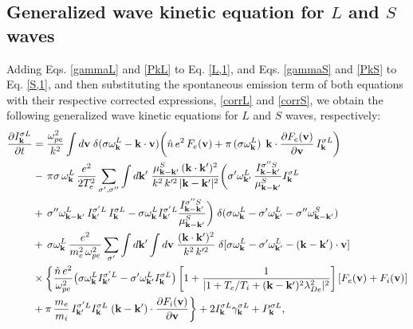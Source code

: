 \documentclass[12pt,a4paper,ruledheader]{report}
\begin{document}
\subsection{Generalized wave kinetic equation for $L$ and $S$ waves}
Adding Eqs. \eqref{gammaL} and \eqref{PkL} to Eq. \eqref{L,1},
and Eqs. \eqref{gammaS} and \eqref{PkS} to Eq. \eqref{S,1}, and
then substituting the spontaneous emission term of both equations
with their respective corrected expressions, \eqref{corrL} and
\eqref{corrS}, we obtain the following generalized wave kinetic
equations for $L$ and $S$ waves, respectively:
\begin{equation}
  \label{L-gen}
  \begin{split}
\frac{\partial I_{\bf k}^{\sigma L}}{\partial t}
&=\frac{\omega_{pe}^2}{k^2}\int d{\bf v}\;
\delta(\sigma\omega_{\bf k}^L-{\bf k}\cdot{\bf v})
\biggl(\hat{n}\,e^2\,F_e({\bf v})+\pi\,(\sigma\omega_{\bf k}^L)\,
\;{\bf k}\cdot\frac{\partial F_e({\bf v})}{\partial{\bf v}}
\,I_{\bf k}^{\sigma L}\biggr)\\
&-\,\pi\sigma\,\omega_{\bf k}^L
\,\frac{e^2}{2T_e^2}\sum_{\sigma ',\sigma ''}\int d{\bf k'}\;
\frac{\mu_{{\bf k}-{\bf k}'}^S
\,({\bf k}\cdot{\bf k}')^2}{k^2\,k'^2\,|{\bf k}-{\bf k}'|^2}
\biggl(\sigma '\omega_{{\bf k}'}^L\,
\frac{I_{{\bf k}-{\bf k}'}^{\sigma ''S}}{\mu_{{\bf k}-{\bf k}'}^S}
I_{\bf k}^{\sigma L}\\
&+\,\sigma ''\omega_{{\bf k}-{\bf k}'}^L
\,I_{{\bf k}'}^{\sigma 'L}\,I_{\bf k}^{\sigma L}
-\sigma\omega_{\bf k}^L I_{{\bf k}'}^{\sigma 'L}
\frac{I_{{\bf k}-{\bf k}'}^{\sigma ''S}}
{\mu_{{\bf k}-{\bf k}'}^S}\biggr)
\;\delta(\sigma\omega_{\bf k}^L-\sigma '\omega_{{\bf k}'}^L
-\sigma ''\omega_{{\bf k}-{\bf k}'}^S)\\
&+\,\sigma\omega_{\bf k}^L\,\frac{e^2}{m_e^2\,\omega_{pe}^2}
\sum_{\sigma '}\int d{\bf k'}\int d{\bf v}\;
\frac{({\bf k}\cdot{\bf k}')^2}{k^2\,k'^2}\;\delta[\sigma\omega_{\bf k}^L
-\sigma '\omega_{{\bf k}'}^L-({\bf k}-{\bf k}')\cdot{\bf v}]\\
&\times\biggl\{\frac{\hat{n}\,e^2}{\omega_{pe}^2}
\bigl(\sigma\omega_{\bf k}^LI_{{\bf k}'}^{\sigma 'L}
  -\sigma '\omega_{{\bf k}'}^L I_{\bf k}^{\sigma L}\bigr)
  \left[1+ \frac{1}{|1+T_e/T_i+({\bf k-k'})^2 \lambda_{De}^2|^2} \right]
[F_e({\bf v})+F_i({\bf v})]\\
&+\pi\,\frac{m_e}{m_i}\,I_{{\bf k}'}^{\sigma 'L}
I_{\bf k}^{\sigma L}\;({\bf k}-{\bf k}')
\cdot\frac{\partial F_i({\bf v})}{\partial{\bf v}}\biggr\}
+2 I_{\bf k}^{\sigma L} \gamma_{\bf k}^{\sigma L}+ P_{\bf k}^{\sigma L},
  \end{split}
\end{equation}
\end{document}
